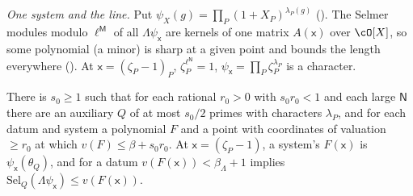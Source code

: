 \emph{One system and the line.} Put $\psi_X(g)=\prod_P(1+X_P)^{\lambda_P(g)}$
(). The Selmer modules modulo $\ell^{\mathsf M}$ of all $\Lambda\psi_{\mathsf x}$ are kernels
of one matrix $A(\mathsf x)$ over $\cO[X]$, so some polynomial (a minor) is sharp at a given point and bounds
the length everywhere (). At $\mathsf x=(\zeta_P-1)_P$,
$\zeta_P^{\ell^{\mathsf N}}=1$, $\psi_{\mathsf x}=\prod_P\zeta_P^{\lambda_P}$ is a character.

\begin{proposition}\label{cg-selmer:prop:line}
There is $s_0\ge1$ such that for each rational $r_0>0$ with $s_0r_0<1$ and each large $\mathsf N$ there are
an auxiliary $Q$ of at most $s_0/2$ primes with characters $\lambda_P$, and for each datum and system
a polynomial $F$ and a point with coordinates of valuation $\ge r_0$ at which $v(F)\le\beta+s_0r_0$.
At $\mathsf x=(\zeta_P-1)$, a system's $F(\mathsf x)$ is $\psi_{\mathsf x}(\theta_Q)$, and for a datum $v(F(\mathsf x))<\beta_\Lambda+1$
implies $\mathrm{Sel}_Q(\Lambda\psi_{\mathsf x})\le v(F(\mathsf x))$.
\end{proposition}

